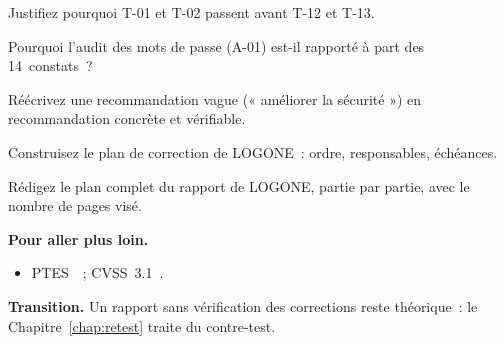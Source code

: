 \begin{boxexo}[title={\ding{45}\quad Exercice~22.6. Priorité \niveaumoyen}]
Justifiez pourquoi T-01 et T-02 passent avant T-12 et T-13.
\end{boxexo}

\begin{boxexo}[title={\ding{45}\quad Exercice~22.7. Mission complémentaire \niveaumoyen}]
Pourquoi l'audit des mots de passe (A-01) est-il rapporté à part des
14~constats~?
\end{boxexo}

\begin{boxexo}[title={\ding{45}\quad Exercice~22.8. Recommandation \niveaumoyen}]
Réécrivez une recommandation vague (« améliorer la sécurité ») en
recommandation concrète et vérifiable.
\end{boxexo}

\begin{boxexo}[title={\ding{45}\quad Exercice~22.9. Plan de correction \niveauexpert}]
Construisez le plan de correction de LOGONE~: ordre, responsables, échéances.
\end{boxexo}

\begin{boxexo}[title={\ding{45}\quad Exercice~22.10. Rapport complet \niveauexpert}]
Rédigez le plan complet du rapport de LOGONE, partie par partie, avec le
nombre de pages visé.
\end{boxexo}

\bigskip

\begin{boxinfo}
\textbf{Pour aller plus loin.}
\begin{itemize}
    \item PTES~\cite{ptes}~; CVSS~3.1~\cite{first2019cvss31}.
\end{itemize}
\end{boxinfo}

\begin{boxinfo}
\textbf{Transition.} Un rapport sans vérification des corrections reste
théorique~: le Chapitre~\ref{chap:retest} traite du contre-test.
\end{boxinfo}
